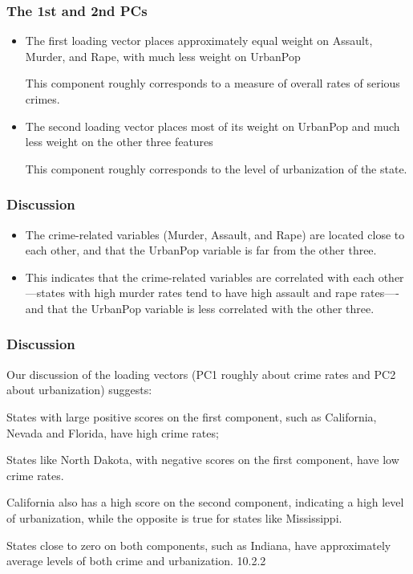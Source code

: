 \documentclass{beamer}
\begin{document}
  \begin{frame}
  	\frametitle{ The  1st and 2nd PCs}
  	\begin{itemize}
  		\item  The first loading vector places approximately
  		equal weight on Assault, Murder, and Rape, with much less weight on UrbanPop
  		
  	   This component roughly corresponds to a measure of overall
  	  rates of serious crimes.
  	  
  	  \item The second loading vector places most of its weight
  	  on UrbanPop and much less weight on the other three features
  	  
  	  This
  	  component roughly corresponds to the level of urbanization of the state.
  	  
  	  \end{itemize}
  	   \end{frame}
  	   
  	   \begin{frame}
  	   	\frametitle{Discussion }
  	   	\begin{itemize}
  	  
  	  \item  The crime-related variables (Murder, Assault, and Rape)
  	  are located close to each other, and that the UrbanPop variable is far from
  	  the other three. 
  	  
  	  \item This indicates that the crime-related variables are correlated
  	  with each other---states with high murder rates tend to have high
  	  assault and rape rates----and that the UrbanPop variable is less correlated
  	  with the other three. 
  	   


 \end{itemize}
\end{frame}

\begin{frame}
	\frametitle{Discussion }
 
	
Our discussion of the loading
vectors (PC1 roughly about crime rates and PC2 about urbanization)
suggests:

States with large positive scores on the first component,
such as California, Nevada and Florida, have high crime rates;


States like North Dakota, with negative scores on the first component, have
low crime rates. 

California also has a high score on the second component,
indicating a high level of urbanization, while the opposite is true for states
like Mississippi. 

States close to zero on both components, such as Indiana,
have approximately average levels of both crime and urbanization.
10.2.2

  	
  
\end{frame} 
\end{document}
